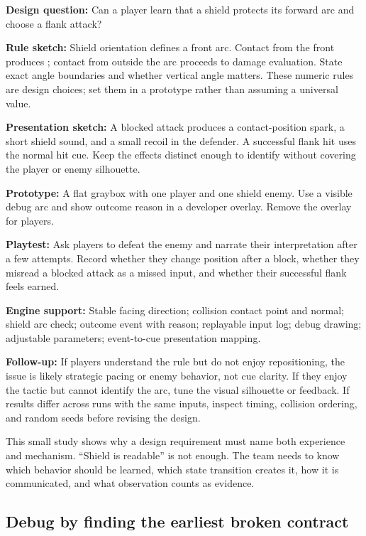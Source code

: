 \hypertarget{06-engine-ii-ch041-a-case-study-checklist-make-the-shield-readable}{}

\textbf{Design question:} Can a player learn that a shield protects its forward arc and choose a flank attack?

\textbf{Rule sketch:} Shield orientation defines a front arc. Contact from the front produces ; contact from outside the arc proceeds to damage evaluation. State exact angle boundaries and whether vertical angle matters. These numeric rules are design choices; set them in a prototype rather than assuming a universal value.

\textbf{Presentation sketch:} A blocked attack produces a contact-position spark, a short shield sound, and a small recoil in the defender. A successful flank hit uses the normal hit cue. Keep the effects distinct enough to identify without covering the player or enemy silhouette.

\textbf{Prototype:} A flat graybox with one player and one shield enemy. Use a visible debug arc and show outcome reason in a developer overlay. Remove the overlay for players.

\textbf{Playtest:} Ask players to defeat the enemy and narrate their interpretation after a few attempts. Record whether they change position after a block, whether they misread a blocked attack as a missed input, and whether their successful flank feels earned.

\textbf{Engine support:} Stable facing direction; collision contact point and normal; shield arc check; outcome event with reason; replayable input log; debug drawing; adjustable parameters; event-to-cue presentation mapping.

\textbf{Follow-up:} If players understand the rule but do not enjoy repositioning, the issue is likely strategic pacing or enemy behavior, not cue clarity. If they enjoy the tactic but cannot identify the arc, tune the visual silhouette or feedback. If results differ across runs with the same inputs, inspect timing, collision ordering, and random seeds before revising the design.

This small study shows why a design requirement must name both experience and mechanism. ``Shield is readable'' is not enough. The team needs to know which behavior should be learned, which state transition creates it, how it is communicated, and what observation counts as evidence.

\subsection{Debug by finding the earliest broken contract}\label{06-engine-ii-ch041-debug-by-finding-the-earliest-broken-contract}

